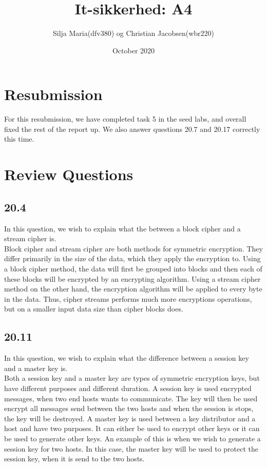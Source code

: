 \documentclass{article}
\title{It-sikkerhed: A4}
\author{Silja Maria(dfv380) og Christian Jacobsen(wbr220) }
\date{October 2020}
\begin{document}
\maketitle

\section{Resubmission}
For this resubmission, we have completed task 5 in the seed labs, and overall fixed
the rest of the report up. We also answer questions 20.7 and 20.17 correctly this
time. \\


\section{Review Questions}

\subsection{20.4}
In this question, we wish to explain what the between a block cipher and a stream cipher is.\\ 

Block cipher and stream cipher are both methods for symmetric encryption. They differ primarily in the size of the data, which they apply the encryption to. Using a block cipher method, the data will first be grouped into blocks and then each of these blocks will be encrypted by an encrypting algorithm. Using a stream cipher method on the other hand, the encryption algorithm will be applied to every byte in the data. Thus, cipher streams performs much more encryptions operations, but on a smaller input data size than cipher blocks does. 


\subsection{20.11}
In this question, we wish to explain what the difference between a session key and a master key is.\\

Both a session key and a master key are types of symmetric encryption keys, but have different purposes and different duration. A session key is used encrypted messages, when two end hosts wants to communicate. The key will then be used encrypt all messages send between the two hosts and when the session is stops, the key will be destroyed. A master key is used between a key distributor and a host and have two purposes. It can either be used to encrypt other keys or it can be used to generate other keys. An example of this is when we wish to generate a session key for two hosts. In this case, the master key will be used to protect the session key, when it is send to the two hosts. 
\end{document}
